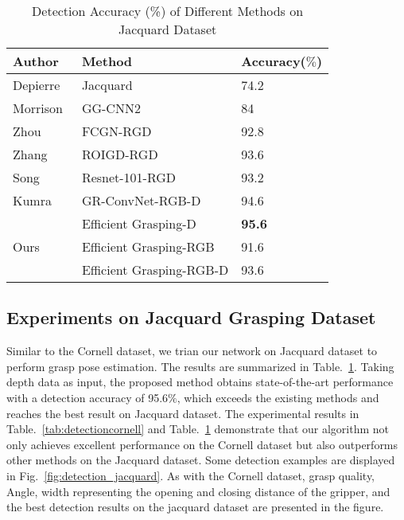\documentclass[journal]{IEEEtran}
\begin{document}
\begin{table}[htbp]
	\caption{Detection Accuracy (\%) of Different Methods on Jacquard Dataset}
	\begin{center}
		\begin{tabular}{p{40pt}|p{100pt}|p{45pt}}
			\hline
			\textbf{Author}&\textbf{Method}&{\textbf{Accuracy($\%$)}}   \\
			\hline
			Depierre~\cite{depierre}&Jacquard& 74.2\\
			Morrison~\cite{ggcnn}&GG-CNN2& 84\\
			Zhou~\cite{zhou}& FCGN-RGD& 92.8\\
			Zhang~\cite{roi}&  ROIGD-RGD& 93.6\\
			Song~\cite{song}& Resnet-101-RGD& 93.2\\
			Kumra~\cite{kumra}& GR-ConvNet-RGB-D& 94.6\\
			\hline
			\multirow{3}{*}{Ours}& Efficient Grasping-D &\textbf{95.6} \\
			&Efficient Grasping-RGB & 91.6\\
			&Efficient Grasping-RGB-D & 93.6\\
			\hline
		\end{tabular}
	\end{center}
	\label{tab:detection_jacquard}
\end{table}


\subsection{Experiments on Jacquard Grasping Dataset}



Similar to the Cornell dataset, we trian our network on Jacquard dataset to perform grasp pose estimation. The results are summarized in Table.~\ref{tab:detection_jacquard}. Taking depth data as input, the proposed method obtains state-of-the-art performance with a detection accuracy of 95.6$\%$, which exceeds the existing methods and reaches the best result on Jacquard dataset. The experimental results in Table.~\ref{tab:detectioncornell} and Table.~\ref{tab:detection_jacquard} demonstrate that our algorithm not only achieves excellent performance on the Cornell dataset but also outperforms other methods on the Jacquard dataset. Some detection examples are displayed in Fig.~\ref{fig:detection_jacquard}. As with the Cornell dataset, grasp quality, Angle, width representing the opening and closing distance of the gripper, and the best detection results on the jacquard dataset are presented in the figure.
\end{document}

